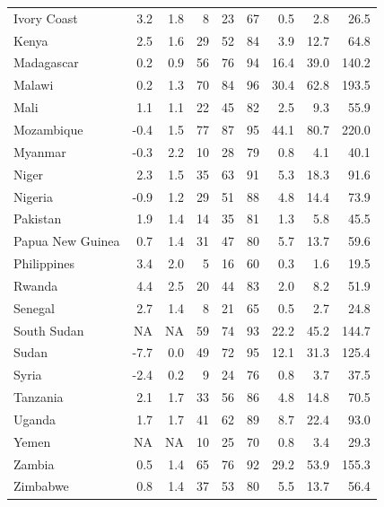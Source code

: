 \begin{table}[h]
{\begin{tabular}[t]{lrrrrrrrr}
Ivory Coast & 3.2 & 1.8 & 8 & 23 & 67 & 0.5 & 2.8 & 26.5\\
Kenya & 2.5 & 1.6 & 29 & 52 & 84 & 3.9 & 12.7 & 64.8\\
Madagascar & 0.2 & 0.9 & 56 & 76 & 94 & 16.4 & 39.0 & 140.2\\
Malawi & 0.2 & 1.3 & 70 & 84 & 96 & 30.4 & 62.8 & 193.5\\
Mali & 1.1 & 1.1 & 22 & 45 & 82 & 2.5 & 9.3 & 55.9\\
Mozambique & -0.4 & 1.5 & 77 & 87 & 95 & 44.1 & 80.7 & 220.0\\
Myanmar & -0.3 & 2.2 & 10 & 28 & 79 & 0.8 & 4.1 & 40.1\\
Niger & 2.3 & 1.5 & 35 & 63 & 91 & 5.3 & 18.3 & 91.6\\
Nigeria & -0.9 & 1.2 & 29 & 51 & 88 & 4.8 & 14.4 & 73.9\\
Pakistan & 1.9 & 1.4 & 14 & 35 & 81 & 1.3 & 5.8 & 45.5\\
Papua New Guinea & 0.7 & 1.4 & 31 & 47 & 80 & 5.7 & 13.7 & 59.6\\
Philippines & 3.4 & 2.0 & 5 & 16 & 60 & 0.3 & 1.6 & 19.5\\
Rwanda & 4.4 & 2.5 & 20 & 44 & 83 & 2.0 & 8.2 & 51.9\\
Senegal & 2.7 & 1.4 & 8 & 21 & 65 & 0.5 & 2.7 & 24.8\\
South Sudan & NA & NA & 59 & 74 & 93 & 22.2 & 45.2 & 144.7\\
Sudan & -7.7 & 0.0 & 49 & 72 & 95 & 12.1 & 31.3 & 125.4\\
Syria & -2.4 & 0.2 & 9 & 24 & 76 & 0.8 & 3.7 & 37.5\\
Tanzania & 2.1 & 1.7 & 33 & 56 & 86 & 4.8 & 14.8 & 70.5\\
Uganda & 1.7 & 1.7 & 41 & 62 & 89 & 8.7 & 22.4 & 93.0\\
Yemen & NA & NA & 10 & 25 & 70 & 0.8 & 3.4 & 29.3\\
Zambia & 0.5 & 1.4 & 65 & 76 & 92 & 29.2 & 53.9 & 155.3\\
Zimbabwe & 0.8 & 1.4 & 37 & 53 & 80 & 5.5 & 13.7 & 56.4\\
\bottomrule
\end{tabular}}
\end{table}